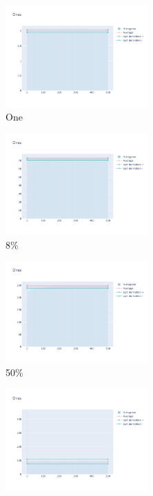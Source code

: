 \documentclass[12pt, fleqn]{report}                             %
\theoremstyle{break}                                            %
\begin{document}
      \begin{figure}[ht!]
        \centering
        \begin{subfigure}[b]{0.4\linewidth}
          \includegraphics[width=0.6\textwidth]{Images/14/dia-a.png}
          \caption{One}
        \end{subfigure}
        \begin{subfigure}[b]{0.4\linewidth}
          \includegraphics[width=0.6\textwidth]{Images/14/dia-b.png}
          \caption{8\%}
        \end{subfigure}
        \begin{subfigure}[b]{0.4\linewidth}
          \includegraphics[width=0.6\textwidth]{Images/14/dia-c.png}
          \caption{50\%}
        \end{subfigure}
        \begin{subfigure}[b]{0.4\linewidth}
          \includegraphics[width=0.6\textwidth]{Images/14/dia-d.png}

\end{subfigure}
\end{figure}
\end{document}
